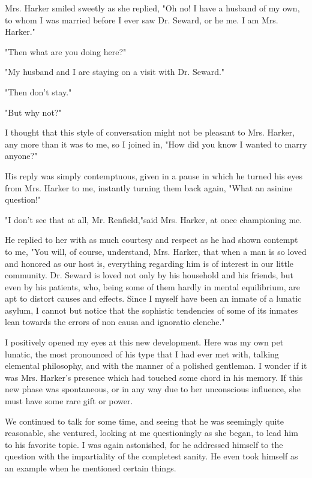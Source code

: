 Mrs. Harker smiled sweetly as she replied, "Oh no! I have a husband of my own, to whom I was married before I ever saw Dr. Seward, or he me. I am Mrs. Harker." 

"Then what are you doing here?" 

"My husband and I are staying on a visit with Dr. Seward." 

"Then don't stay." 

"But why not?" 

I thought that this style of conversation might not be pleasant to Mrs. Harker, any more than it was to me, so I joined in, "How did you know I wanted to marry anyone?" 

His reply was simply contemptuous, given in a pause in which he turned his eyes from Mrs. Harker to me, instantly turning them back again, "What an asinine question!" 

"I don't see that at all, Mr. Renfield,"said Mrs. Harker, at once championing me. 

He replied to her with as much courtesy and respect as he had shown contempt to me, "You will, of course, understand, Mrs. Harker, that when a man is so loved and honored as our host is, everything regarding him is of interest in our little community. Dr. Seward is loved not only by his household and his friends, but even by his patients, who, being some of them hardly in mental equilibrium, are apt to distort causes and effects. Since I myself have been an inmate of a lunatic asylum, I cannot but notice that the sophistic tendencies of some of its inmates lean towards the errors of non causa and ignoratio elenche." 

I positively opened my eyes at this new development. Here was my own pet lunatic, the most pronounced of his type that I had ever met with, talking elemental philosophy, and with the manner of a polished gentleman. I wonder if it was Mrs. Harker's presence which had touched some chord in his memory. If this new phase was spontaneous, or in any way due to her unconscious influence, she must have some rare gift or power. 

We continued to talk for some time, and seeing that he was seemingly quite reasonable, she ventured, looking at me questioningly as she began, to lead him to his favorite topic. I was again astonished, for he addressed himself to the question with the impartiality of the completest sanity. He even took himself as an example when he mentioned certain things. 


